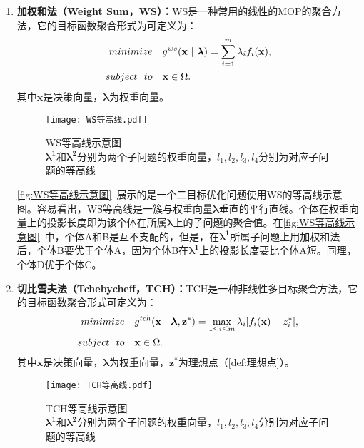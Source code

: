 \begin{enumerate}
    \item \textbf{加权和法（Weight Sum，WS）：}WS是一种常用的线性的MOP的聚合方法\cite{hillermeier2001nonlinear}，它的目标函数聚合形式为可定义为：
    \begin{align}
        \label{eq:WS}
        minimize \quad & g^{ws}(\mathbf{x} \ | \ \boldsymbol{\lambda}) = \sum_{i=1}^m \lambda_i f_i(\mathbf{x}), \\
        subject \ \ to \quad & \mathbf{x} \in \Omega. \notag
    \end{align}
    其中$\mathbf{x}$是决策向量，$\boldsymbol{\lambda}$为权重向量。
    \begin{figure}[htb]
        \texttt{[image: WS等高线.pdf]}
        \caption[WS等高线示意图]{WS等高线示意图 \\ $\boldsymbol{\lambda^1}$和$\boldsymbol{\lambda^2}$分别为两个子问题的权重向量，$l_1, l_2, l_3, l_4$分别为对应子问题的等高线}
        \label{fig:WS等高线示意图}
    \end{figure}
    \par
    \autoref{fig:WS等高线示意图}~展示的是一个二目标优化问题使用WS的等高线示意图。容易看出，WS等高线是一簇与权重向量$\boldsymbol{\lambda}$垂直的平行直线。个体在权重向量上的投影长度即为该个体在所属$\boldsymbol{\lambda}$上的子问题的聚合值。在\autoref{fig:WS等高线示意图}~中，个体A和B是互不支配的，但是，在$\boldsymbol{\lambda^1}$所属子问题上用加权和法后，个体B要优于个体A，因为个体B在$\boldsymbol{\lambda^1}$上的投影长度要比个体A短。同理，个体D优于个体C。
    \item \textbf{切比雪夫法（Tchebycheff，TCH）：}TCH是一种非线性多目标聚合方法\cite{jaszkiewicz2002performance}，它的目标函数聚合形式可定义为：
    \begin{align}
        \label{eq:TCH}
        minimize \quad & g^{tch}(\mathbf{x} \ | \ \boldsymbol{\lambda},\mathbf{z}^*) = \max_{1 \leq i \leq m} \lambda_i | f_i(\mathbf{x}) - z^*_i |, \\
        subject \ \ to \quad & \mathbf{x} \in \Omega. \notag
    \end{align}
    其中$\mathbf{x}$是决策向量，$\boldsymbol{\lambda}$为权重向量，$\mathbf{z}^*$为理想点（\autoref{def:理想点}）。
    \par
    \begin{figure}[htb]
        \texttt{[image: TCH等高线.pdf]}
        \caption[TCH等高线示意图]{TCH等高线示意图 \\ $\boldsymbol{\lambda^1}$和$\boldsymbol{\lambda^2}$分别为两个子问题的权重向量，$l_1, l_2, l_3, l_4$分别为对应子问题的等高线}

\end{figure}
\end{enumerate}
